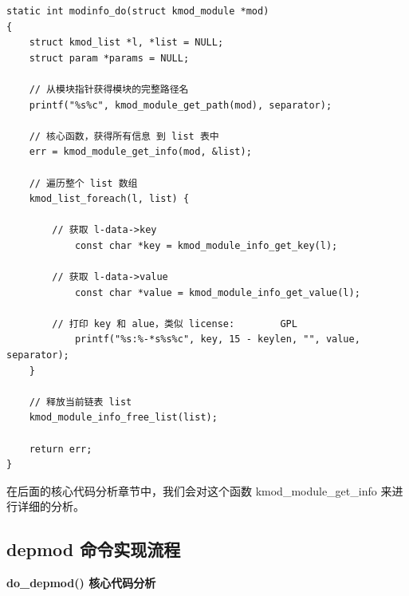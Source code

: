 {\begin{shaded}\begin{verbatim}
static int modinfo_do(struct kmod_module *mod)
{
    struct kmod_list *l, *list = NULL;
    struct param *params = NULL;

    // 从模块指针获得模块的完整路径名
    printf("%s%c", kmod_module_get_path(mod), separator);

    // 核心函数，获得所有信息 到 list 表中
    err = kmod_module_get_info(mod, &list);

    // 遍历整个 list 数组
    kmod_list_foreach(l, list) {

        // 获取 l-data->key 
            const char *key = kmod_module_info_get_key(l);

        // 获取 l-data->value
            const char *value = kmod_module_info_get_value(l);

        // 打印 key 和 alue，类似 license:        GPL
            printf("%s:%-*s%s%c", key, 15 - keylen, "", value, separator);
    }

    // 释放当前链表 list
    kmod_module_info_free_list(list);

    return err;
}
\end{verbatim}\end{shaded}}
在后面的核心代码分析章节中，我们会对这个函数 kmod\_module\_get\_info
来进行详细的分析。

\subsection{depmod 命令实现流程}

\textbf{do\_depmod() 核心代码分析}


